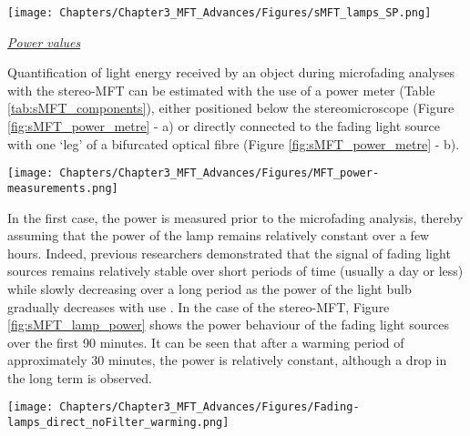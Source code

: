 \begin{figure*}
\centering
\texttt{[image: Chapters/Chapter3\_MFT\_Advances/Figures/sMFT\_lamps\_SP.png]}
\caption[\hspace{0.3cm}Spectral power distribution of the light sources]{Spectral power distribution of the light sources used in the stereo-MFT.}
\label{fig:sMFT_SP}
\end{figure*}

\underline{\textit{Power values}}

Quantification of light energy received by an object during microfading analyses with the stereo-MFT can be estimated with the use of a power meter (Table \ref{tab:sMFT_components}), either positioned below the stereomicroscope (Figure \ref{fig:sMFT_power_metre} - a) or directly connected to the fading light source with one ‘leg’ of a bifurcated optical fibre (Figure  \ref{fig:sMFT_power_metre} - b). \\

\begin{figure*}
\centering
\texttt{[image: Chapters/Chapter3\_MFT\_Advances/Figures/MFT\_power-measurements.png]}
\caption[\hspace{0.3cm}Power measurement with the stereo-MFT]{Power measurement with the stereo-MFT: prior to analyses (a) ; during microfading analyses (b).}
\label{fig:sMFT_power_metre}
\end{figure*}

In the first case, the power is measured prior to the microfading analysis, thereby assuming that the power of the lamp remains relatively constant over a few hours. Indeed, previous researchers demonstrated that the signal of fading light sources remains relatively stable over short periods of time (usually a day or less) while slowly decreasing over a long period as the power of the light bulb gradually decreases with use \citep[106, Figure II.35]{del_hoyo-melendez_survey_2010}. In the case of the stereo-MFT, Figure \ref{fig:sMFT_lamp_power} shows the power behaviour of the fading light sources over the first 90 minutes. It can be seen that after a warming period of approximately 30 minutes, the power is relatively constant, although a drop in the long term is observed.\\

\begin{figure*}
\centering
\texttt{[image: Chapters/Chapter3\_MFT\_Advances/Figures/Fading-lamps\_direct\_noFilter\_warming.png]}
\caption[\hspace{0.3cm}Power values of the fading light sources]{Power values of the fading light sources (see Table \ref{tab:sMFT_components} for more information).}
\label{fig:sMFT_lamp_power}
\end{figure*}


